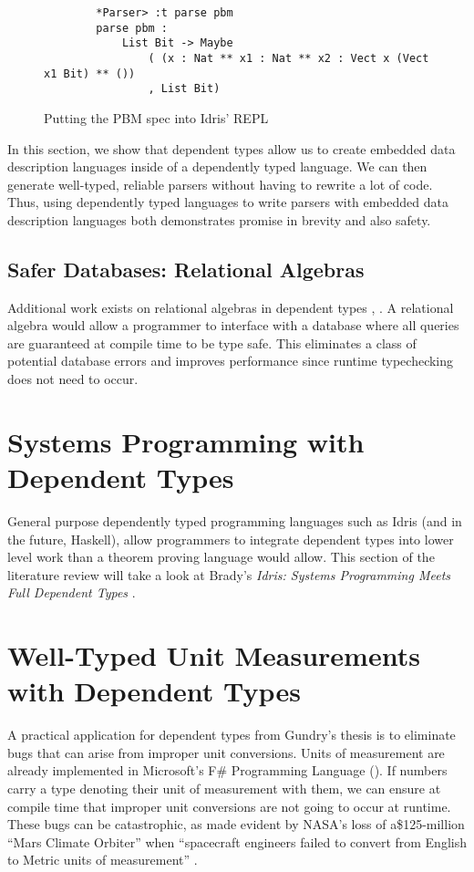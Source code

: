 \begin{figure}
    \caption{Putting the PBM spec into Idris' REPL}
    \label{repl}
    \begin{lstlisting}
        *Parser> :t parse pbm
        parse pbm : 
            List Bit -> Maybe 
                ( (x : Nat ** x1 : Nat ** x2 : Vect x (Vect x1 Bit) ** ())
                , List Bit)
    \end{lstlisting}
\end{figure}

In this section, we show that dependent types allow us to create embedded data description languages inside of a dependently typed language. We can then generate well-typed, reliable parsers without having to rewrite a lot of code. Thus, using dependently typed languages to write parsers with embedded data description languages both demonstrates promise in brevity and also safety. 

\subsection{Safer Databases: Relational Algebras}

Additional work exists on relational algebras in dependent types
\cite{power_of_pi}, \cite{eisenberg2016}. A relational algebra would allow a
programmer to interface with a database where all queries are guaranteed at
compile time to be type safe. This eliminates a class of potential database
errors and improves performance since runtime typechecking does not need to
occur. 

\section{Systems Programming with Dependent Types}

General purpose dependently typed programming languages such as Idris (and in
the future, Haskell), allow programmers to integrate dependent types into lower
level work than a theorem proving language would allow. This section of the literature review will take a look at Brady's \textit{Idris: Systems Programming Meets Full Dependent Types} \cite{idris_systems_programming}.

\section{Well-Typed Unit Measurements with Dependent Types}

A practical application for dependent types from Gundry's thesis is to eliminate
bugs that can arise from improper unit conversions. Units of measurement are
already implemented in Microsoft's F\# Programming Language
(\cite{kennedy2009}). If numbers carry a type denoting their unit of measurement
with them, we can ensure at compile time that improper unit conversions are not
going to occur at runtime. These bugs can be catastrophic, as made evident by
NASA's loss of a\$125-million ``Mars Climate Orbiter'' when ``spacecraft
engineers failed to convert from English to Metric units of measurement''
\cite{hotz1999}. 


